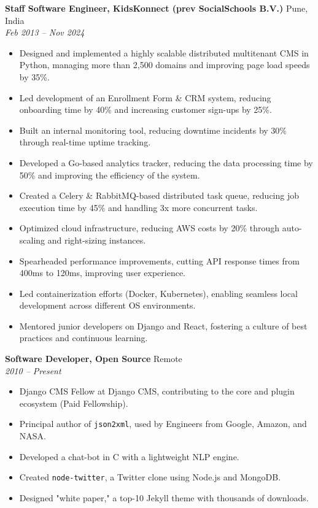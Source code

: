 \documentclass[a4paper,10pt]{article}
\begin{document}
\textbf{Staff Software Engineer, KidsKonnect (prev SocialSchools B.V.)} \hfill Pune, India \\
\textit{Feb 2013 – Nov 2024}  
\begin{itemize}[leftmargin=0.15in]
    \item Designed and implemented a highly scalable distributed multitenant CMS in Python, managing more than 2,500 domains and improving page load speeds by 35\%.
    \item Led development of an Enrollment Form \& CRM system, reducing onboarding time by 40\% and increasing customer sign-ups by 25\%.
    \item Built an internal monitoring tool, reducing downtime incidents by 30\% through real-time uptime tracking.
    \item Developed a Go-based analytics tracker, reducing the data processing time by 50\% and improving the efficiency of the system.
    \item Created a Celery \& RabbitMQ-based distributed task queue, reducing job execution time by 45\% and handling 3x more concurrent tasks.
    \item Optimized cloud infrastructure, reducing AWS costs by 20\% through auto-scaling and right-sizing instances.
    \item Spearheaded performance improvements, cutting API response times from 400ms to 120ms, improving user experience.
    \item Led containerization efforts (Docker, Kubernetes), enabling seamless local development across different OS environments.
    \item Mentored junior developers on Django and React, fostering a culture of best practices and continuous learning.
\end{itemize}

\textbf{Software Developer, Open Source} \hfill Remote \\
\textit{2010 – Present}  
\begin{itemize}[leftmargin=0.15in]
    \item Django CMS Fellow at Django CMS, contributing to the core and plugin ecosystem (Paid Fellowship).
    \item Principal author of \texttt{json2xml}, used by Engineers from Google, Amazon, and NASA.
    \item Developed a chat-bot in C with a lightweight NLP engine.
    \item Created \texttt{node-twitter}, a Twitter clone using Node.js and MongoDB.
    \item Designed "white paper," a top-10 Jekyll theme with thousands of downloads.
\end{itemize}
\end{document}
